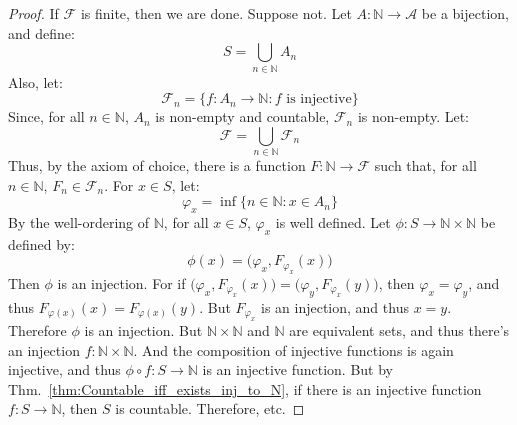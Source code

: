             \begin{proof}
                If $\mathcal{F}$ is finite, then we are done. Suppose not.
                Let $A:\mathbb{N}\rightarrow\mathcal{A}$ be a bijection,
                and define:
                \begin{equation}
                    S=\bigcup_{n\in\mathbb{N}}A_{n}
                \end{equation}
                Also, let:
                \begin{equation}
                    \mathcal{F}_{n}
                    =\{f:A_{n}\rightarrow\mathbb{N}:
                        f\textrm{ is injective}\}
                \end{equation}
                Since, for all $n\in\mathbb{N}$, $A_{n}$ is
                non-empty and countable, $\mathcal{F}_{n}$
                is non-empty. Let:
                \begin{equation}
                    \mathcal{F}
                    =\bigcup_{n\in\mathbb{N}}\mathcal{F}_{n}
                \end{equation}
                Thus, by the axiom of choice, there is a function
                $F:\mathbb{N}\rightarrow\mathcal{F}$ such that, for all
                $n\in\mathbb{N}$, $F_{n}\in\mathcal{F}_{n}$. For
                $x\in{S}$, let:
                \begin{equation}
                    \varphi_{x}
                    =\inf\{n\in\mathbb{N}:x\in{A}_{n}\}
                \end{equation}
                By the well-ordering of $\mathbb{N}$, for all
                $x\in{S}$, $\varphi_{x}$ is well defined. Let
                $\phi:S\rightarrow\mathbb{N}\times\mathbb{N}$
                be defined by:
                \begin{equation}
                    \phi(x)
                    =\big(\varphi_{x},F_{\varphi_{x}}(x)\big)
                \end{equation}
                Then $\phi$ is an injection. For if
                $\big(\varphi_{x},F_{\varphi_{x}}(x)\big)=%
                 \big(\varphi_{y},F_{\varphi_{x}}(y)\big)$, then
                $\varphi_{x}=\varphi_{y}$, and thus
                $F_{\varphi(x)}(x)=F_{\varphi(x)}(y)$. But
                $F_{\varphi_{x}}$ is an injection, and
                thus $x=y$. Therefore $\phi$ is an injection.
                But $\mathbb{N}\times\mathbb{N}$ and $\mathbb{N}$
                are equivalent sets, and thus there's an
                injection $f:\mathbb{N}\times\mathbb{N}$. And
                the composition of injective functions is again
                injective, and thus
                $\phi\circ{f}:S\rightarrow\mathbb{N}$ is an
                injective function. But by
                Thm.~\ref{thm:Countable_iff_exists_inj_to_N},
                if there is an injective function
                $f:S\rightarrow\mathbb{N}$, then $S$ is
                countable. Therefore, etc.
            \end{proof}

